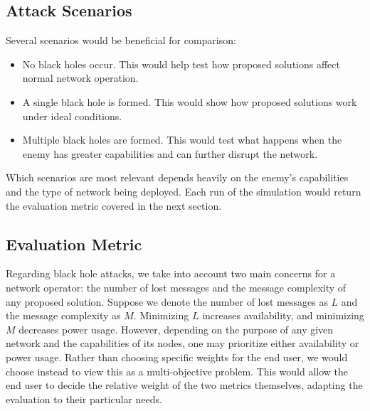 \documentclass[12pt,a4paper]{report}
\begin{document}
\subsection{Attack Scenarios}
Several scenarios would be beneficial for comparison:
\begin{itemize}
    \item No black holes occur. This would help test how proposed solutions affect normal network operation.
    \item A single black hole is formed. This would show how proposed solutions work under ideal conditions.
    \item Multiple black holes are formed. This would test what happens when the enemy has greater capabilities and can further disrupt the network.
\end{itemize}
Which scenarios are most relevant depends heavily on the enemy's capabilities and the type of network being deployed. Each run of the simulation would return the evaluation metric covered in the next section.

\subsection{Evaluation Metric}
Regarding black hole attacks, we take into account two main concerns for a network operator: the number of lost messages and the message complexity of any proposed solution. Suppose we denote the number of lost messages as $L$ and the message complexity as $M$. Minimizing $L$ increases availability, and minimizing $M$ decreases power usage. However, depending on the purpose of any given network and the capabilities of its nodes, one may prioritize either availability or power usage. Rather than choosing specific weights for the end user, we would choose instead to view this as a multi-objective problem. This would allow the end user to decide the relative weight of the two metrics themselves, adapting the evaluation to their particular needs.



\end{document}
